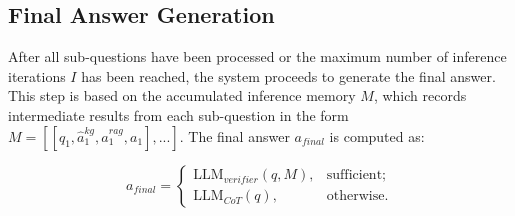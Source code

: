 \subsection{Final Answer Generation}
After all sub-questions have been processed or the maximum number of inference iterations $I$ has been reached, the system proceeds to generate the final answer. This step is based on the accumulated inference memory $M$, which records intermediate results from each sub-question in the form $M=[[q_1,\hat{a}_1^{kg},\hat{a}_1^{rag},a_1],...]$. The final answer $a_{final}$ is computed as:

\begin{equation}
a_{final} = 
\begin{cases}
\text{LLM}_{verifier}(q,M), & \text{sufficient;} \\
\text{LLM}_{CoT}(q), & \text{otherwise.}
\end{cases}
\end{equation}


